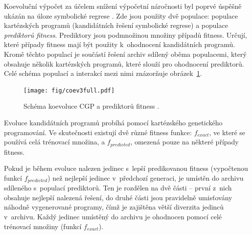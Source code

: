 Koevoluční výpočet za účelem snížení výpočetní náročnosti byl poprvé úspěšně ukázán na úloze symbolické regrese \cite{SikuEuroGP}. Zde jsou použity dvě populace: populace kartézských programů (kandidátních řešení symbolické regrese) a populace \emph{prediktorů fitness}. Prediktory jsou podmnožinou množiny případů fitness. Určují, které případy fitness mají být použity k~ohodnocení kandidátních programů. Kromě těchto populací je součástí řešení archiv sdílený oběma populacemi, který obsahuje několik kartézských programů, které slouží pro ohodnocení prediktorů. Celé schéma populací a interakcí mezi nimi znázorňuje obrázek~\ref{obrKoevoluce}.

\begin{figure}[htb]
    \baselineskip
    \centering\texttt{[image: fig/coev3full.pdf]}
    \caption{Schéma koevoluce CGP a prediktorů fitness \cite{SikuEuroGP}.}
    \label{obrKoevoluce}
\end{figure}

Evoluce kandidátních programů probíhá pomocí kartézského genetického programování. Ve skutečnosti existují dvě různé fitness funkce: $f_{\mathit{exact}}$, ve které se používá celá trénovací množina, a $f_{\mathit{predicted}}$, omezená pouze na některé případy fitness.




Pokud je během evoluce nalezen jedinec s~lepší predikovanou fitness (vypočtenou funkcí $f_{\mathit{predicted}}$) než nejlepší jedinec v~předchozí generaci, je umístěn do archivu sdíleného s~populací prediktorů. Ten je rozdělen na dvě části -- první z~nich obsahuje nejlepší nalezená řešení, do druhé části jsou pravidelně umisťovány náhodně vygenerované programy, čímž je zajištěna větší diverzita jedinců v~archivu. Každý jedinec umístěný do archivu je ohodnocen pomocí celé trénovací množiny (funkcí $f_{\mathit{exact}}$).

